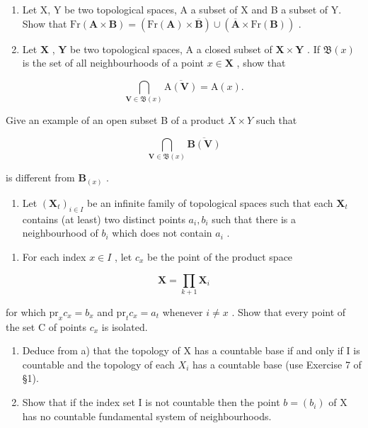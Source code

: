 \BourbakiExerciseGroup

\begin{enumerate}
\def\labelenumi{\arabic{enumi})}
\item
  Let X, Y be two topological spaces, A a subset of X and B a subset of Y. Show that \(\mathrm{Fr}(\mathbf{A} \times \mathbf{B}) = (\mathrm{Fr}(\mathbf{A}) \times \overline{\mathbf{B}}) \cup (\overline{\mathbf{A}} \times \mathrm{Fr}(\mathbf{B}))\) .
\item
  Let \(\mathbf{X}\) , \(\mathbf{Y}\) be two topological spaces, A a closed subset of \(\mathbf{X} \times \mathbf{Y}\) . If \(\mathfrak{B}(x)\) is the set of all neighbourhoods of a point \(x \in \mathbf{X}\) , show that
\end{enumerate}

\[
\bigcap_ {\mathbf {V} \in \mathfrak {B} (x)} \overline {{\mathrm{A} (\mathbf {V})}} = \mathrm{A} (x).
\]

Give an example of an open subset B of a product \(X \times Y\) such that

\[
\bigcap_ {\mathbf {V} \in \mathfrak {B} (x)} \overline {{\mathbf {B} (\mathbf {V})}}
\]

is different from \(\mathbf{B}_{(x)}\) .

\begin{enumerate}
\def\labelenumi{\arabic{enumi})}
\setcounter{enumi}{2}
\tightlist
\item
  Let \((\mathbf{X}_t)_{i\in I}\) be an infinite family of topological spaces such that each \(\mathbf{X}_t\) contains (at least) two distinct points \(a_i, b_i\) such that there is a neighbourhood of \(b_i\) which does not contain \(a_i\) .
\end{enumerate}

\begin{enumerate}
\def\labelenumi{\alph{enumi})}
\tightlist
\item
  For each index \(x \in I\) , let \(c_{x}\) be the point of the product space
\end{enumerate}

\[
\mathbf {X} = \prod_ {k + 1} \mathbf {X} _ {i}
\]

for which \(\mathrm{pr}_x c_x = b_x\) and \(\mathrm{pr}_t c_x = a_t\) whenever \(i \neq x\) . Show that every point of the set C of points \(c_x\) is isolated.

\begin{enumerate}
\def\labelenumi{\alph{enumi})}
\setcounter{enumi}{1}
\item
  Deduce from a) that the topology of X has a countable base if and only if I is countable and the topology of each \(X_{i}\) has a countable base (use Exercise 7 of §1).
\item
  Show that if the index set I is not countable then the point \(b = (b_{i})\) of X has no countable fundamental system of neighbourhoods.
\end{enumerate}

